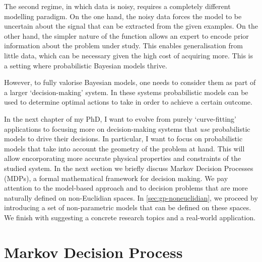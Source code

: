 The second regime, in which data is noisy, requires a completely different modelling paradigm. On the one hand, the noisy data forces the model to be uncertain about the signal that can be extracted from the given examples. On the other hand, the simpler nature of the function allows an expert to encode prior information about the problem under study. This enables generalisation from little data, which can be necessary given the high cost of acquiring more. This is a setting where probabilistic Bayesian models thrive.

However, to fully valorise Bayesian models, one needs to consider them as part of a larger `decision-making' system. In these systems probabilistic models can be used to determine optimal actions to take in order to achieve a certain outcome. %

In the next chapter of my PhD, I want to evolve from purely `curve-fitting' applications to focusing more on decision-making systems that \emph{use} probabilistic models to drive their decisions. In particular, I want to focus on probabilistic models that take into account the geometry of the problem at hand. This will allow encorporating more accurate physical properties and constraints of the studied system. In the next section we briefly discuss Markov Decision Processes (MDPs), a formal mathematical framework for decision making. We pay attention to the model-based approach and to decision problems that are more naturally defined on non-Euclidian spaces. In \cref{sec:gp-noneuclidian}, we proceed by introducing a set of non-parametric models that can be defined on these spaces. We finish with suggesting a concrete research topics and a real-world application.


\section{Markov Decision Process}
\label{section:mdp}

